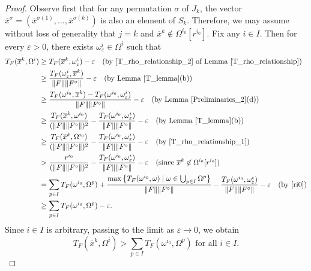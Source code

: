 \documentclass[sn-mathphys-num]{sn-jnl}%
\theoremstyle{definition}
\begin{document}
\begin{proof} Observe first that for any permutation $\sigma$ of $J_k$, the vector 
	$\overline{x}^\sigma = (\overline{x}^{\sigma(1)},\dots,\overline{x}^{\sigma(k)})$ 
	is also an element of  $S_k$. Therefore, we may assume without loss of generality that 
	$j=k$ and $\overline{x}^k \not\in \Omega^{i_0}[r^{i_0}]$. Fix any $i \in I$. Then for every $\varepsilon > 0$, there exists $\omega_\varepsilon^i \in \Omega^i$ such that 
	\begin{equation}
		\label{G.O.Solutions_9_1}
		\begin{aligned}
			T_F(\overline{x}^k,\Omega^i)&\geq T_F(\overline{x}^k,\omega^i_{\varepsilon})-\varepsilon\quad(\text{by \eqref{T_rho_relationship_2} of Lemma~\ref{T_rho_relationship}})\\
&\geq\frac{T_F(\omega^i_{\varepsilon},\overline{x}^k)}{\|F\|\|F^\circ\|} -\varepsilon \quad (\text{by Lemma~\ref{T_lemma}(b)})\\
			&\geq\frac{T_F(\omega^{i_0},\overline{x}^k)-T_F(\omega^{i_0},\omega^i_{\varepsilon})}{\|F\|\|F^\circ\|}-\varepsilon \quad (\text{by Lemma~\ref{Preliminaries_2}(d)})\\
			&\geq\frac{T_F(\overline{x}^k,\omega^{i_0})}{(\|F\|\|F^\circ\|)^2}-\frac{T_F(\omega^{i_0},\omega^i_\varepsilon)}{\|F\|\|F^\circ\|}-\varepsilon \quad (\text{by Lemma~\ref{T_lemma}(b)})\\
			&\geq \frac{T_F(\overline{x}^k,\Omega^{i_0})}{(\|F\|\|F^\circ\|)^2} -\frac{T_F(\omega^{i_0},\omega^i_\varepsilon)}{\|F\|\|F^\circ\|}-\varepsilon \quad (\text{by~\eqref{T_rho_relationship_1}})\\
			&>\frac{r^{i_0}}{(\|F\|\|F^\circ\|)^2}-\frac{T_F(\omega^{i_0},\omega^i_\varepsilon)}{\|F\|\|F^\circ\|}-\varepsilon \quad (\text{since } \overline{x}^k \not\in \Omega^{i_0}[r^{i_0}])\\
			&=\sum_{p \in I}T_F(\omega^{i_0},\Omega^p)+\frac{\max\big\{T_F(\omega^{i_0},\omega)\mid \omega \in \bigcup_{p \in I}\Omega^p\big\}}{\|F\|\|F^\circ\|}-\frac{T_F(\omega^{i_0},\omega^i_\varepsilon)}{\|F\|\|F^\circ\|}-\varepsilon \quad (\text{by~\eqref{ri0}})\\
			&\geq \sum_{p \in I}T_F(\omega^{i_0},\Omega^p)-\varepsilon.
		\end{aligned}
	\end{equation}
	Since $i \in I$ is arbitrary, passing to the limit as $\varepsilon \to 0$, we obtain
	\begin{equation}
		\label{G.O.Solutions_9_2}
		T_F(\overline{x}^k,\Omega^i)> \sum_{p \in I}T_F(\omega^{i_0},\Omega^p) \text{ for all } i \in I.

\end{equation}
\end{proof}
\end{document}
